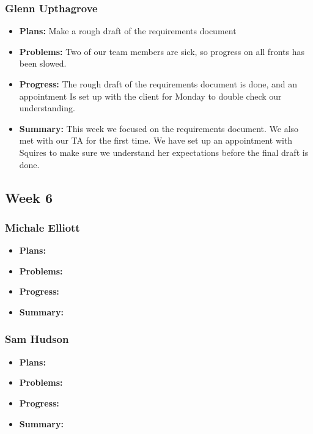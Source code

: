 \documentclass[onecolumn, draftclsnofoot,10pt, compsoc]{IEEEtran}
\begin{document}
\subsubsection{Glenn Upthagrove}
\begin {itemize}
 \item \textbf{Plans: }Make a rough draft of the requirements document
 \item \textbf{Problems: }Two of our team members are sick, so progress on all fronts has been slowed.
 \item \textbf{Progress: }The rough draft of the requirements document is done, and an appointment Is set up with the client for Monday to double check our understanding. 
 \item \textbf{Summary: }This week we focused on the requirements document. We also met with our TA for the first time. We have set up an appointment with Squires to make sure we understand her expectations before the final draft is done.  
\end {itemize}
\subsection {Week 6}
\subsubsection{Michale Elliott}
\begin {itemize}
 \item \textbf{Plans: }
 \item \textbf{Problems: }
 \item \textbf{Progress: }
 \item \textbf{Summary: }
\end {itemize}
\subsubsection{Sam Hudson}
\begin {itemize}
 \item \textbf{Plans: }
 \item \textbf{Problems: }
 \item \textbf{Progress: }
 \item \textbf{Summary: }
\end {itemize}
\end{document}
